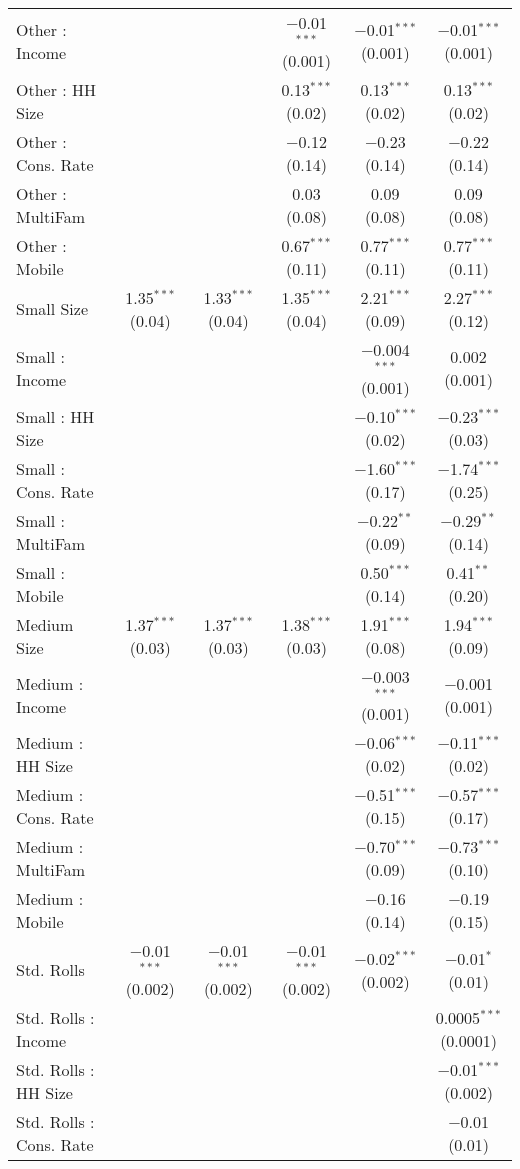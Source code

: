 \begin{table}[!htbp]
\begin{tabular}{@{\extracolsep{5pt}}lccccc}
  Other : Income &  &  & $-$0.01$^{***}$ (0.001) & $-$0.01$^{***}$ (0.001) & $-$0.01$^{***}$ (0.001) \\ 
  Other : HH Size &  &  & 0.13$^{***}$ (0.02) & 0.13$^{***}$ (0.02) & 0.13$^{***}$ (0.02) \\ 
  Other : Cons. Rate &  &  & $-$0.12 (0.14) & $-$0.23 (0.14) & $-$0.22 (0.14) \\ 
  Other : MultiFam &  &  & 0.03 (0.08) & 0.09 (0.08) & 0.09 (0.08) \\ 
  Other : Mobile &  &  & 0.67$^{***}$ (0.11) & 0.77$^{***}$ (0.11) & 0.77$^{***}$ (0.11) \\ 
  Small Size & 1.35$^{***}$ (0.04) & 1.33$^{***}$ (0.04) & 1.35$^{***}$ (0.04) & 2.21$^{***}$ (0.09) & 2.27$^{***}$ (0.12) \\ 
  Small : Income &  &  &  & $-$0.004$^{***}$ (0.001) & 0.002 (0.001) \\ 
  Small : HH Size &  &  &  & $-$0.10$^{***}$ (0.02) & $-$0.23$^{***}$ (0.03) \\ 
  Small : Cons. Rate &  &  &  & $-$1.60$^{***}$ (0.17) & $-$1.74$^{***}$ (0.25) \\ 
  Small : MultiFam &  &  &  & $-$0.22$^{**}$ (0.09) & $-$0.29$^{**}$ (0.14) \\ 
  Small : Mobile &  &  &  & 0.50$^{***}$ (0.14) & 0.41$^{**}$ (0.20) \\ 
  Medium Size & 1.37$^{***}$ (0.03) & 1.37$^{***}$ (0.03) & 1.38$^{***}$ (0.03) & 1.91$^{***}$ (0.08) & 1.94$^{***}$ (0.09) \\ 
  Medium : Income &  &  &  & $-$0.003$^{***}$ (0.001) & $-$0.001 (0.001) \\ 
  Medium : HH Size &  &  &  & $-$0.06$^{***}$ (0.02) & $-$0.11$^{***}$ (0.02) \\ 
  Medium : Cons. Rate &  &  &  & $-$0.51$^{***}$ (0.15) & $-$0.57$^{***}$ (0.17) \\ 
  Medium : MultiFam &  &  &  & $-$0.70$^{***}$ (0.09) & $-$0.73$^{***}$ (0.10) \\ 
  Medium : Mobile &  &  &  & $-$0.16 (0.14) & $-$0.19 (0.15) \\ 
  Std. Rolls & $-$0.01$^{***}$ (0.002) & $-$0.01$^{***}$ (0.002) & $-$0.01$^{***}$ (0.002) & $-$0.02$^{***}$ (0.002) & $-$0.01$^{*}$ (0.01) \\ 
  Std. Rolls : Income &  &  &  &  & 0.0005$^{***}$ (0.0001) \\ 
  Std. Rolls : HH Size &  &  &  &  & $-$0.01$^{***}$ (0.002) \\ 
  Std. Rolls : Cons. Rate &  &  &  &  & $-$0.01 (0.01) \\ 

\end{tabular}
\end{table}

